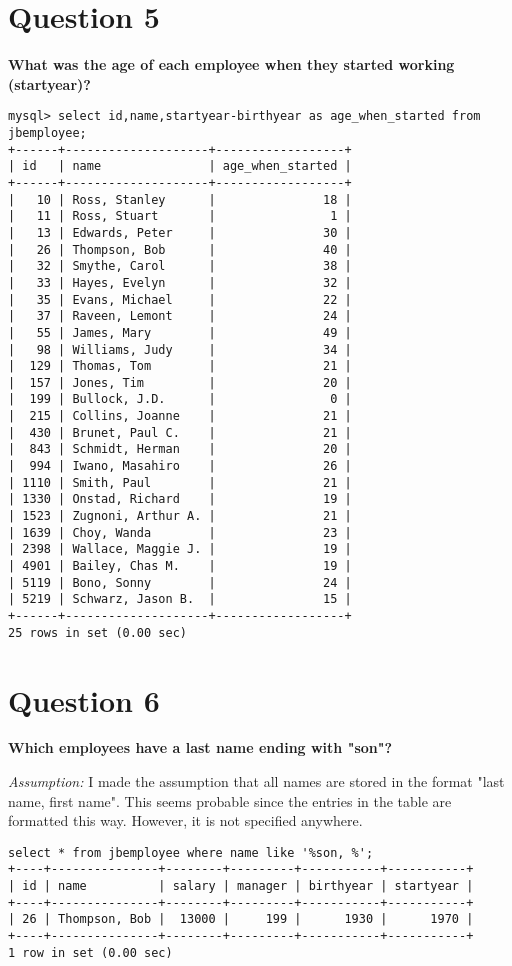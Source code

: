 \documentclass{article}
\begin{document}
\section*{Question 5}
\textbf{What was the age of each employee when they started working (startyear)?}

\begin{lstlisting}
mysql> select id,name,startyear-birthyear as age_when_started from jbemployee;
+------+--------------------+------------------+
| id   | name               | age_when_started |
+------+--------------------+------------------+
|   10 | Ross, Stanley      |               18 |
|   11 | Ross, Stuart       |                1 |
|   13 | Edwards, Peter     |               30 |
|   26 | Thompson, Bob      |               40 |
|   32 | Smythe, Carol      |               38 |
|   33 | Hayes, Evelyn      |               32 |
|   35 | Evans, Michael     |               22 |
|   37 | Raveen, Lemont     |               24 |
|   55 | James, Mary        |               49 |
|   98 | Williams, Judy     |               34 |
|  129 | Thomas, Tom        |               21 |
|  157 | Jones, Tim         |               20 |
|  199 | Bullock, J.D.      |                0 |
|  215 | Collins, Joanne    |               21 |
|  430 | Brunet, Paul C.    |               21 |
|  843 | Schmidt, Herman    |               20 |
|  994 | Iwano, Masahiro    |               26 |
| 1110 | Smith, Paul        |               21 |
| 1330 | Onstad, Richard    |               19 |
| 1523 | Zugnoni, Arthur A. |               21 |
| 1639 | Choy, Wanda        |               23 |
| 2398 | Wallace, Maggie J. |               19 |
| 4901 | Bailey, Chas M.    |               19 |
| 5119 | Bono, Sonny        |               24 |
| 5219 | Schwarz, Jason B.  |               15 |
+------+--------------------+------------------+
25 rows in set (0.00 sec)
\end{lstlisting}

\pagebreak

\section*{Question 6}
\textbf{Which employees have a last name ending with "son"?}

\textit{Assumption:} I made the assumption that all names are stored in the format "last name, first name". This seems probable since the entries in the table are formatted this way. However, it is not specified anywhere.

\begin{lstlisting}
select * from jbemployee where name like '%son, %';
+----+---------------+--------+---------+-----------+-----------+
| id | name          | salary | manager | birthyear | startyear |
+----+---------------+--------+---------+-----------+-----------+
| 26 | Thompson, Bob |  13000 |     199 |      1930 |      1970 |
+----+---------------+--------+---------+-----------+-----------+
1 row in set (0.00 sec)
\end{lstlisting}
\end{document}
